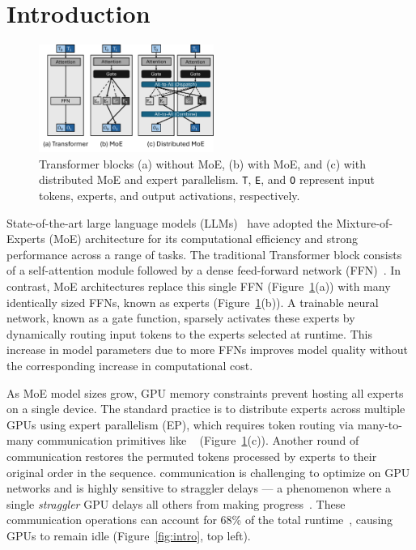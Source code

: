 \section{Introduction}\label{sec:introduction}

\begin{figure}
    \centering
    \includegraphics[width=0.51\textwidth, keepaspectratio]{figures/fig-bg-moe}
    \caption{Transformer blocks (a) without MoE, (b) with MoE, and (c) with distributed MoE and expert parallelism.
    \texttt{T}, \texttt{E}, and \texttt{O} represent input tokens, experts, and output activations, respectively.}
    \label{fig:bg:moe}
    \vspace{-10pt}
\end{figure}

State-of-the-art large language models (LLMs)~\cite{deepep, llama4, dbrx, arctic, openai2025gptoss} have adopted the Mixture-of-Experts (MoE) architecture for its computational efficiency and strong performance across a range of tasks. The traditional Transformer block consists of a self-attention module followed by a dense feed-forward network (FFN)~\cite{NIPS2017_3f5ee243}. In contrast, MoE architectures replace this single FFN (Figure~\ref{fig:bg:moe}(a)) with many identically sized FFNs, known as experts (Figure~\ref{fig:bg:moe}(b)). A trainable neural network, known as a gate function, sparsely activates these experts by dynamically routing input tokens to the experts selected at runtime. This increase in model parameters due to more FFNs improves model quality without the corresponding increase in computational cost.

As MoE model sizes grow, GPU memory constraints prevent hosting all experts on a single device. The standard practice is to distribute experts across multiple GPUs using expert parallelism (EP), which requires token routing via many-to-many communication primitives like \alltoall~\cite{deepep, arctic, dbrx, 10.1145/3577193.3593704} (Figure~\ref{fig:bg:moe}(c)). Another round of \alltoall communication restores the permuted tokens processed by experts to their original order in the sequence. \alltoall communication is challenging to optimize on GPU networks and is highly sensitive to straggler delays --- a phenomenon where a single \emph{straggler} GPU delays all others from making progress~\cite{stragglar}. These communication operations can account for 68\% of the total runtime~\cite{10.1145/3603269.3604869, MLSYS2024_339caf45}, causing GPUs to remain idle (Figure~\ref{fig:intro}, top left).


